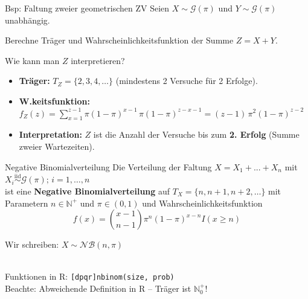 \documentclass[
  10pt,
  ignorenonframetext,
]{beamer}
\providecommand{\tightlist}{%
  \setlength{\itemsep}{0pt}\setlength{\parskip}{0pt}}
\begin{document}
\begin{frame}{Bsp: Faltung zweier geometrischen ZV}
\protect\hypertarget{bsp-faltung-zweier-geometrischen-zv}{}
Seien \(X \sim {\mathcal G}(\pi)\) und \(Y \sim {\mathcal G}(\pi)\)
unabhängig.

Berechne Träger und Wahrscheinlichkeitsfunktion der Summe \(Z=X+Y\).

Wie kann man \(Z\) interpretieren?

\begin{itemize}[<+->]
\tightlist
\item
  \textbf{Träger:} \(T_Z = \{2, 3, 4, \dots\}\) (mindestens 2 Versuche
  für 2 Erfolge).
\item
  \textbf{W.keitsfunktion:}
  \(f_Z(z) = \sum_{x=1}^{z-1} \pi(1-\pi)^{x-1}\, \pi(1-\pi)^{z-x-1} = (z-1)\,\pi^2 (1-\pi)^{z-2}\)
\item
  \textbf{Interpretation:} \(Z\) ist die Anzahl der Versuche bis zum
  \textbf{2. Erfolg} (Summe zweier Wartezeiten).
\end{itemize}

\end{frame}

\begin{frame}[fragile]{Negative Binomialverteilung}
\protect\hypertarget{negative-binomialverteilung}{}
Die Verteilung der Faltung \(X = X_1 + ... + X_n\) mit
\(X_i \stackrel{\text{iid}}{\sim} \mathcal{G}(\pi);\, i= 1, \dots, n\)\\
ist eine \textbf{Negative Binomialverteilung} auf
\(T_X = \{n, n+1, n+2, \ldots\}\) mit Parametern \(n \in \mathbb{N}^+\)
und \(\pi \in (0,1)\) und Wahrscheinlichkeitsfunktion \[
f(x) = \binom{x - 1}{n - 1} \pi^n (1-\pi)^{x-n} I(x \geq n)
\]

Wir schreiben: \(X\sim \mathcal{NB}(n, \pi)\)\\
\strut \\

Funktionen in R: \texttt{{[}dpqr{]}nbinom(size,\ prob)}\\
Beachte: Abweichende Definition in R -- Träger ist \(\mathbb{N}^+_0\)!
\end{frame}
\end{document}
